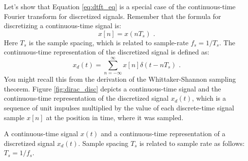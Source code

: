 Let's show that Equation \ref{eq:dtft_eq} is a special case of the
continuous-time Fourier transform for discretized signals. Remember
that the formula for discretizing a continuous-time signal is:
\begin{equation}
x[n] = x(nT_s)\,\,.%
\end{equation}
Here $T_s$ is the sample spacing, which is related to sample-rate
$f_s=1/T_s$. The continuous-time representation of the discretized
signal is defined as:
\begin{equation}
x_d(t) = \sum_{n=-\infty}^{\infty} x[n] \delta(t-n T_s) \,\,.
\end{equation}
You might recall this from the derivation of the Whittaker-Shannon
sampling theorem. Figure \ref{fig:dirac_disc} depicts a
continuous-time signal and the continuous-time representation of the
discretized signal $x_d(t)$, which is a sequence of unit impulses
multiplied by the value of each discrete-time signal sample $x[n]$ at
the position in time, where it was sampled.
\begin{marginfigure}[-3cm]
\begin{center}
\end{center}
\caption{A continuous-time signal $x(t)$ and a continuous-time representation of a discretized signal $x_d(t)$. Sample spacing $T_s$ is related to sample rate as follows: $T_s = 1/f_s$.}
\label{fig:dirac_disc}
\end{marginfigure}

